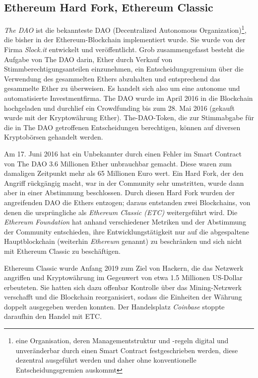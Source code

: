 \subsection{Ethereum Hard Fork, Ethereum Classic}\label{l_hard_fork}
\textit{The DAO} ist die bekannteste DAO (Decentralized Autonomous Organization)\footnote{eine Organisation, deren Managementstruktur und -regeln digital und unveränderbar durch einen Smart Contract festgeschrieben werden, diese dezentral ausgeführt werden und daher ohne konventionelle Entscheidungsgremien auskommt}, die bisher in der Ethereum-Blockchain implementiert wurde. Sie wurde von der Firma \textit{Slock.it} entwickelt und veröffentlicht. Grob zusammengefasst besteht die Aufgabe von The DAO darin, Ether durch Verkauf von Stimmberechtigungsanteilen einzunehmen, ein Entscheidungsgremium über die Verwendung des gesammelten Ethers abzuhalten und entsprechend das gesammelte Ether zu überweisen. Es handelt sich also um eine autonome und automatisierte Investmentfirma. The DAO wurde im April 2016 in die Blockchain hochgeladen und durchlief ein Crowdfunding bis zum 28. Mai 2016 (gekauft wurde mit der Kryptowährung Ether). The-DAO-Token, die zur Stimmabgabe für die in The DAO getroffenen Entscheidungen berechtigen, können auf diversen Kryptobörsen gehandelt werden.

Am 17. Juni 2016 hat ein Unbekannter durch einen Fehler im Smart Contract von The DAO 3.6 Millionen Ether unbrauchbar gemacht. Diese waren zum damaligen Zeitpunkt mehr als 65 Millionen Euro wert. Ein Hard Fork, der den Angriff rückgängig macht, war in der Community sehr umstritten, wurde dann aber in einer Abstimmung beschlossen. Durch diesen Hard Fork wurden der angreifenden DAO die Ethers entzogen; daraus entstanden zwei Blockchains, von denen die ursprüngliche als \textit{Ethereum Classic (ETC)} weitergeführt wird. Die \textit{Ethereum Foundation} hat anhand verschiedener Metriken und der Abstimmung der Community entschieden, ihre Entwicklungstätigkeit nur auf die abgespaltene Hauptblockchain (weiterhin \textit{Ethereum} genannt) zu beschränken und sich nicht mit Ethereum Classic zu beschäftigen.

Ethereum Classic wurde Anfang 2019 zum Ziel von Hackern, die das Netzwerk angriffen und Kryptowährung im Gegenwert von etwa 1.5 Millionen US-Dollar erbeuteten. Sie hatten sich dazu offenbar Kontrolle über das Mining-Netzwerk verschafft und die Blockchain reorganisiert, sodass die Einheiten der Währung doppelt ausgegeben werden konnten. Der Handelsplatz \textit{Coinbase} stoppte daraufhin den Handel mit ETC.

